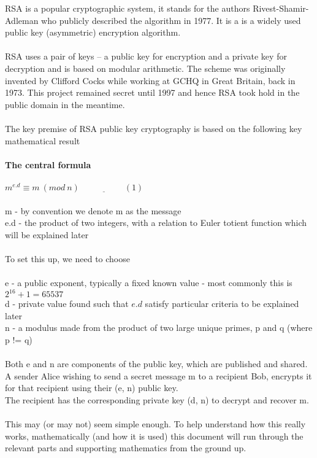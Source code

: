 \documentclass[11pt]{article}   	%
\begin{document}
RSA is a popular cryptographic system, it stands for the authors Rivest-Shamir-Adleman who publicly described the algorithm in 1977.
It is a is a widely used public key (asymmetric) encryption algorithm. \\
\\
RSA uses a pair of keys – a public key for encryption and a private key for decryption and is based on modular arithmetic.
The scheme was originally invented by Clifford Cocks while working at GCHQ in Great Britain, back in 1973. This project remained secret until 1997 and hence RSA took hold in the public domain in the meantime. \\
\\
The key premise of RSA public key cryptography is based on the following key mathematical result \\
\\
\textbf{The central formula} \\
\\
$ m^{e.d} \equiv m \ (mod \ n)  \ \ \underline{\hspace{2cm}}(1) $\\
\\
m - by convention we denote m as the message \\
e.d - the product of two integers, with a relation to Euler totient function which will be explained later \\
\\
To set this up, we need to choose \\
\\
e - a public exponent, typically a fixed known value - most commonly this is $ 2^{16} + 1 = 65537 $ \\
d - private value found such that $ e.d $ satisfy particular criteria to be explained later \\
n - a modulus made from the product of two large unique primes, p and q (where p != q) \\
\\
Both e and n are components of the public key, which are published and shared. \\
A sender Alice wishing to send a secret message m to a recipient Bob, encrypts it for that recipient using their (e, n) public key. \\
The recipient has the corresponding private key (d, n) to decrypt and recover m. \\
\\
This may (or may not) seem simple enough. To help understand how this really works, mathematically (and how it is used) this document will run through the relevant parts and supporting mathematics from the ground up. \\
\end{document}
